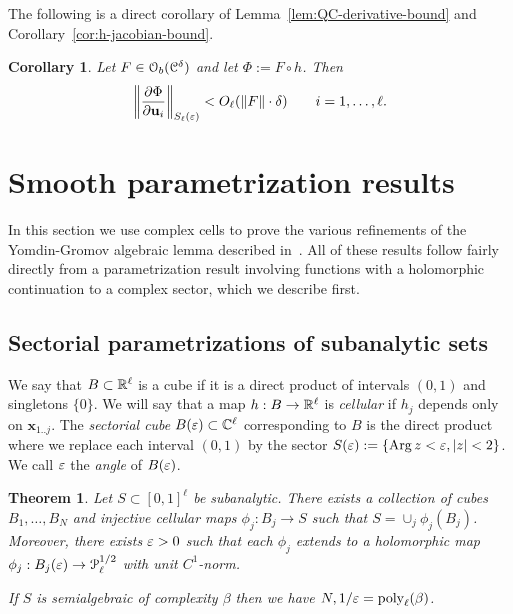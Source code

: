 \documentclass[reqno]{amsart}
\newtheorem{Thm}{Theorem}{\bfseries}{\itshape}
\newtheorem{Cor}{Corollary}{\bfseries}{\itshape}
\renewcommand\~[1]{\widetilde{#1}}
\def\pd#1#2{\frac{\partial#1}{\partial#2}}
\def\Arg{\operatorname{Arg}} \def\dist{\operatorname{dist}}
\def\poly{\operatorname{poly}} \def\J{\operatorname{J}}
\def\cP{{\mathcal P}} \def\cR{{\mathcal R}}
\def\cO{{\mathcal O}}
\def\vx{{\mathbf x}}
\def\vu{{\mathbf u}}
\begin{document}
The following is a direct corollary of
Lemma~\ref{lem:QC-derivative-bound} and
Corollary~\ref{cor:h-jacobian-bound}.

\begin{Cor}\label{cor:Phi-C1-norm}
  Let $F\in\cO_b(\cC^\delta)$ and let $\Phi:=F\circ h$. Then
  \begin{equation}
    \norm{\pd{\Phi}{\vu_i}}_{S_\ell(\e)}< O_\ell(\norm{F}\cdot\delta) \qquad i=1,\ldots,\ell.
  \end{equation}
\end{Cor}


\section{Smooth parametrization results}

In this section we use complex cells to prove the various refinements
of the Yomdin-Gromov algebraic lemma described
in~. All of these results follow fairly
directly from a parametrization result involving functions with a
holomorphic continuation to a complex sector, which we describe first.


\subsection{Sectorial parametrizations of subanalytic sets}
\label{sec:sectorial-param}

We say that $B\subset{\mathbb R}^\ell$ is a cube if it is a direct product of
intervals $(0,1)$ and singletons $\{0\}$. We will say that a map
$h:B\to{\mathbb R}^\ell$ is \emph{cellular} if $h_j$ depends only on
$\vx_{1..j}$. The \emph{sectorial cube} $B(\varepsilon)\subset{\mathbb C}^\ell$
corresponding to $B$ is the direct product where we replace each
interval $(0,1)$ by the sector $S(\e):=\{\Arg z<\e,|z|<2\}$. We call
$\varepsilon$ the \emph{angle} of $B(\varepsilon)$.

\begin{Thm}\label{thm:sectorial-param}
  Let $S\subset[0,1]^\ell$ be subanalytic. There exists a collection
  of cubes $B_1,\ldots,B_N$ and injective cellular maps
  $\phi_j:B_j\to S$ such that $S=\cup_j\phi_j(B_j)$. Moreover, there
  exists $\varepsilon>0$ such that each $\phi_j$ extends to a holomorphic map
  $\phi_j:B_j(\e)\to\cP_\ell^{1/2}$ with unit $C^1$-norm.

  If $S$ is semialgebraic of complexity $\beta$ then we have
  $N,1/\e=\poly_\ell(\beta)$.
\end{Thm}
\end{document}
